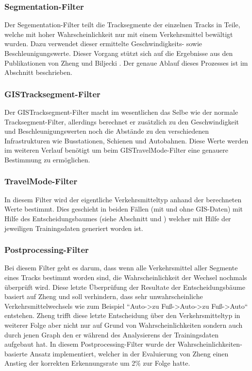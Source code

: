 
\subsubsection{Segmentation-Filter}
Der Segementation-Filter teilt die Tracksegmente der einzelnen Tracks in Teile, welche mit hoher Wahrscheinlichkeit nur mit einem Verkehrsmittel bewältigt wurden. Dazu verwendet dieser ermittelte Geschwindigkeits- sowie Beschleunigungswerte. Dieser Vorgang stützt sich auf die Ergebnisse aus den Publikationen von Zheng \cite{zheng_understanding_2010} und Biljecki \cite{biljecki_transportation_2013}. Der genaue Ablauf dieses Prozesses ist im Abschnitt  beschrieben.

\subsubsection{GISTracksegment-Filter}
\label{gisTracksegmentFilter}
Der GISTracksegment-Filter macht im wesentlichen das Selbe wie der normale Tracksegment-Filter, allerdings berechnet er zusätzlich zu den Geschwindigkeit und Beschleunigungswerten noch die Abstände zu den verschiedenen Infrastrukturen wie Busstationen, Schienen und Autobahnen. Diese Werte werden im weiteren Verlauf benötigt um beim GISTravelMode-Filter eine genauere Bestimmung zu ermöglichen.

\subsubsection{TravelMode-Filter}
In diesem Filter wird der eigentliche Verkehrsmitteltyp anhand der berechneten Werte bestimmt. Dies geschieht in beiden Fällen (mit und ohne GIS-Daten) mit Hilfe des Entscheidungsbaumes (siehe Abschnitt  und ) welcher mit Hilfe der jeweiligen Trainingsdaten generiert worden ist.

\subsubsection{Postprocessing-Filter}
Bei diesem Filter geht es darum, dass wenn alle Verkehrsmittel aller Segmente eines Tracks bestimmt worden sind, die Wahrscheinlichkeit der Wechsel nochmals überprüft wird. Diese letzte Überprüfung der Resultate der Entscheidungsbäume basiert auf Zheng \cite{zheng_understanding_2010} und soll verhindern, dass sehr unwahrscheinliche Verkehrsmittelwechsels wie zum Beispiel ``Auto->zu Fuß->Auto->zu Fuß->Auto`` entstehen. Zheng trifft diese letzte Entscheidung über den Verkehrsmitteltyp in weiterer Folge aber nicht nur auf Grund von Wahrscheinlichkeiten sondern auch durch jenen Graph den er während des Analysierens der Trainingsdaten aufgebaut hat. In diesem Postprocessing-Filter wurde der Wahrscheinlichkeiten-basierte Ansatz implementiert, welcher in der Evaluierung von Zheng einen Anstieg der korrekten Erkennungsrate um 2\% zur Folge hatte.

